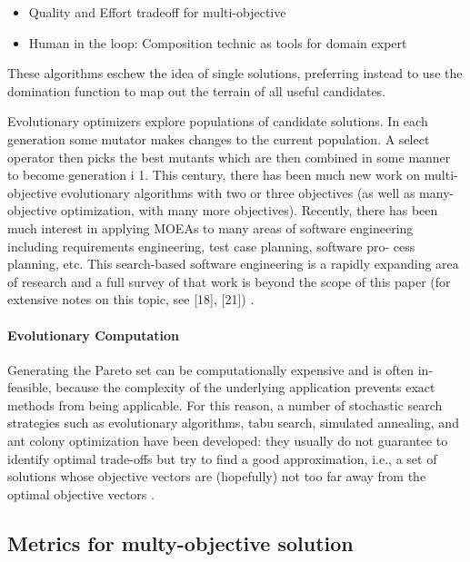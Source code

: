             \begin{itemize}
                \item Quality and Effort tradeoff for multi-objective
                \item Human in the loop: Composition technic as tools for domain expert
            \end{itemize}

            These algorithms eschew the idea of single solutions, preferring instead to use the domination function to map out the terrain of all useful candidates.



            Evolutionary optimizers explore populations of candidate solutions. In each generation some mutator makes changes to the current population. 
            A select operator then picks the best mutants which are then combined in some manner to become generation i 1. 
            This century, there has been much new work on multi-objective evolutionary algorithms with two or three objectives 
            (as well as many-objective optimization, with many more objectives). Recently, there has been much interest in applying MOEAs to many areas 
            of software engineering including requirements engineering, test case planning, software pro- cess planning, etc. 
            This search-based software engineering is a rapidly expanding area of research and a full survey of that work is 
            beyond the scope of this paper (for extensive notes on this topic, see [18], [21]) \cite{MlakarPTF15}.


            \paragraph{Evolutionary Computation}

            Generating the Pareto set can be computationally expensive and is often in- feasible, because the complexity of the underlying application prevents exact methods from being applicable. For this reason, a number of stochastic search strategies such as evolutionary algorithms, tabu search, simulated annealing, and ant colony optimization have been developed: they usually do not guarantee to identify optimal trade-offs but try to find a good approximation, i.e., a set of solutions whose objective vectors are (hopefully) not too far away from the optimal objective vectors \cite{EmmerichD18}.


        \subsection{Metrics for multy-objective solution}

